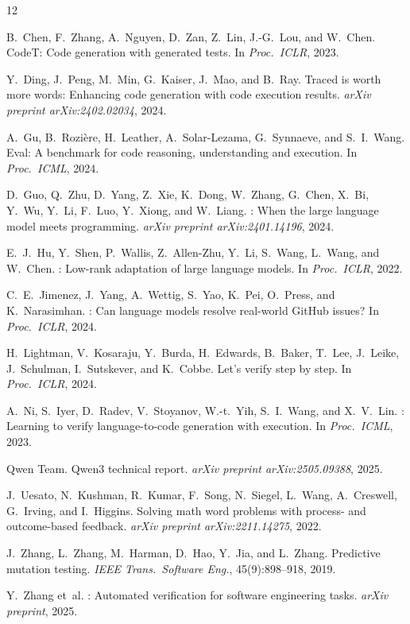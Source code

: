 \documentclass[11pt,a4paper]{article}
\begin{document}

\begin{thebibliography}{12}

B.~Chen, F.~Zhang, A.~Nguyen, D.~Zan, Z.~Lin, J.-G.~Lou, and W.~Chen.
\newblock Code{T}: Code generation with generated tests.
\newblock In \emph{Proc.\ ICLR}, 2023.

Y.~Ding, J.~Peng, M.~Min, G.~Kaiser, J.~Mao, and B.~Ray.
\newblock Traced is worth more words: Enhancing code generation with code execution results.
\newblock \emph{arXiv preprint arXiv:2402.02034}, 2024.

A.~Gu, B.~Rozi\`{e}re, H.~Leather, A.~Solar-Lezama, G.~Synnaeve, and S.~I.~Wang.
Eval: A benchmark for code reasoning, understanding and execution.
\newblock In \emph{Proc.\ ICML}, 2024.

D.~Guo, Q.~Zhu, D.~Yang, Z.~Xie, K.~Dong, W.~Zhang, G.~Chen, X.~Bi, Y.~Wu, Y.~Li, F.~Luo, Y.~Xiong, and W.~Liang.
: When the large language model meets programming.
\newblock \emph{arXiv preprint arXiv:2401.14196}, 2024.

E.~J.~Hu, Y.~Shen, P.~Wallis, Z.~Allen-Zhu, Y.~Li, S.~Wang, L.~Wang, and W.~Chen.
: Low-rank adaptation of large language models.
\newblock In \emph{Proc.\ ICLR}, 2022.

C.~E.~Jimenez, J.~Yang, A.~Wettig, S.~Yao, K.~Pei, O.~Press, and K.~Narasimhan.
: Can language models resolve real-world {GitHub} issues?
\newblock In \emph{Proc.\ ICLR}, 2024.

H.~Lightman, V.~Kosaraju, Y.~Burda, H.~Edwards, B.~Baker, T.~Lee, J.~Leike, J.~Schulman, I.~Sutskever, and K.~Cobbe.
\newblock Let's verify step by step.
\newblock In \emph{Proc.\ ICLR}, 2024.

A.~Ni, S.~Iyer, D.~Radev, V.~Stoyanov, W.-t.~Yih, S.~I.~Wang, and X.~V.~Lin.
: Learning to verify language-to-code generation with execution.
\newblock In \emph{Proc.\ ICML}, 2023.

{Qwen Team}.
\newblock Qwen3 technical report.
\newblock \emph{arXiv preprint arXiv:2505.09388}, 2025.

J.~Uesato, N.~Kushman, R.~Kumar, F.~Song, N.~Siegel, L.~Wang, A.~Creswell, G.~Irving, and I.~Higgins.
\newblock Solving math word problems with process- and outcome-based feedback.
\newblock \emph{arXiv preprint arXiv:2211.14275}, 2022.

J.~Zhang, L.~Zhang, M.~Harman, D.~Hao, Y.~Jia, and L.~Zhang.
\newblock Predictive mutation testing.
\newblock \emph{IEEE Trans.\ Software Eng.}, 45(9):898--918, 2019.

Y.~Zhang et~al.
: Automated verification for software engineering tasks.
\newblock \emph{arXiv preprint}, 2025.

\end{thebibliography}
\end{document}
